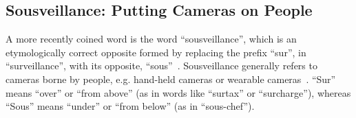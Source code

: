 \subsection{Sousveillance: Putting Cameras on People}
A more recently coined word is the word ``sousveillance'', which is an etymologically correct opposite formed by replacing the prefix ``sur'', in ``surveillance'', with its opposite, ``sous''~\cite{mann2002sousveillance, fletcher2011, michael2012sousveillance, bradwell2012security}. Sousveillance generally refers to cameras borne by people, e.g. hand-held cameras or wearable cameras~\cite{mann2002sousveillance, michael2012sousveillance, bradwell2012security, fletcher2011, negativesousveillance, bakir2010sousveillance}.
``Sur'' means ``over'' or ``from above'' (as in words like ``surtax'' or ``surcharge''), whereas ``Sous'' means ``under'' or ``from below'' (as in ``sous-chef'').
